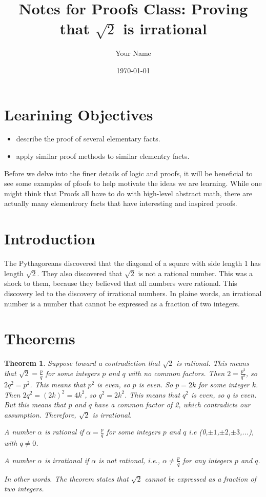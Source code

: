 \documentclass{article}
\title{Notes for Proofs Class: Proving that $\sqrt2$  is irrational}
\author{Your Name}
\date{\today}
\newtheorem{theorem}{Theorem}
\begin{document}
\maketitle

\section{Learining Objectives}
    \begin{itemize}
        \item describe the proof of several elementary facts.
        \item apply similar proof methods to similar elementry facts.
    \end{itemize}

    Before we delve into the finer details of logic and proofs, it will be beneficial to see some 
    examples of pfoofs to help motivate the ideas we are learning. While one might think that Proofs
    all have to do with high-level abstract math, there are actually many elementrory facts that have 
    interesting and inspired proofs. 

\section{Introduction}

     The Pythagoreans discovered that the diagonal of a square with side length 1 has length $\sqrt2$.
     They also discovered that $\sqrt2$ is not a rational number.
     This was a shock to them, because they believed that all numbers were rational.
     This discovery led to the discovery of irrational numbers.
     In plaine words, an irrational number is a number that cannot be expressed as a fraction of two integers.
    


\section{Theorems}

\begin{theorem}
    Suppose toward a contradiction that $\sqrt2$ is rational. This means that $\sqrt2 = \frac{p}{q}$
    for some integers $p$ and $q$ with no common factors. Then $2 = \frac{p^2}{q^2}$, so $2q^2 = p^2$.
    This means that $p^2$ is even, so $p$ is even. So $p = 2k$ for some integer $k$. Then $2q^2 = (2k)^2 = 4k^2$,
    so $q^2 = 2k^2$. This means that $q^2$ is even, so $q$ is even. But this means that $p$ and $q$ have a common
    factor of 2, which contradicts our assumption. Therefore, $\sqrt2$ is irrational.
     
    A number $\alpha$ is rational if $\alpha = \frac{p}{q}$ for some integers $p$ and $q$ i.e (0,$\pm1$,$\pm2$,$\pm3$,...),
    with $q \neq 0$.

    A number $\alpha$ is irrational if $\alpha$ is not rational, i.e., $\alpha \neq \frac{p}{q}$ for any integers $p$ and $q$.

    In other words. The theorem states that $\sqrt{2}$ cannot be expressed as a fraction of two integers.

\end{theorem}
\end{document}
